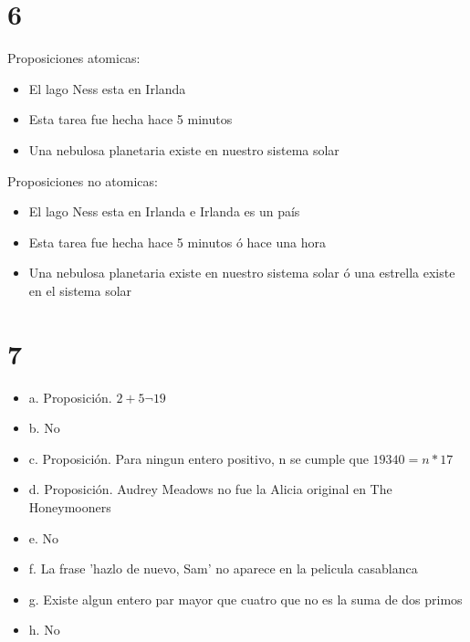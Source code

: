 \documentclass[12pt, fleqn]{article}                            %
\theoremstyle{break}                                            %
\begin{document}
\clearpage
\section{6}        

    Proposiciones atomicas:
    \begin{itemize}
        \item El lago Ness esta en Irlanda
        \item Esta tarea fue hecha hace 5 minutos
        \item Una nebulosa planetaria existe en nuestro sistema solar
    \end{itemize}


    Proposiciones no atomicas:
    \begin{itemize}
        \item El lago Ness esta en Irlanda e Irlanda es un país
        \item Esta tarea fue hecha hace 5 minutos ó hace una hora
        \item Una nebulosa planetaria existe en nuestro sistema solar ó una estrella existe en el
        sistema solar
    \end{itemize}


\vspace{1em}
\section{7}        

    \begin{itemize}
        \item a. Proposición. $2 + 5 \neg 19$
        \item b. No
        \item c. Proposición. Para ningun entero positivo, n se cumple que $19340 = n * 17$
        \item d. Proposición. Audrey Meadows no fue la Alicia original en The Honeymooners
        \item e. No
        \item f. La frase 'hazlo de nuevo, Sam' no aparece en la pelicula casablanca
        \item g. Existe algun entero par mayor que cuatro que no es la suma de dos primos
        \item h. No
    \end{itemize}
\end{document}
